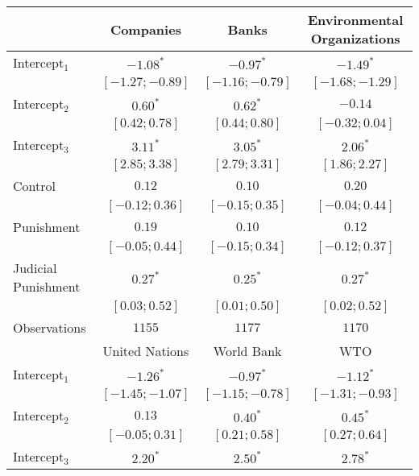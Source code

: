\begin{table}[h]
\begin{center}
\begin{threeparttable}
\begin{tabular}{l c c c}
\hline
 & Companies & Banks & Environmental
Organizations \\
\hline
Intercept$_1$       & $-1.08^{*}$       & $-0.97^{*}$       & $-1.49^{*}$       \\
                    & $ [-1.27; -0.89]$ & $ [-1.16; -0.79]$ & $ [-1.68; -1.29]$ \\
Intercept$_2$       & $0.60^{*}$        & $0.62^{*}$        & $-0.14$           \\
                    & $ [ 0.42;  0.78]$ & $ [ 0.44;  0.80]$ & $ [-0.32;  0.04]$ \\
Intercept$_3$       & $3.11^{*}$        & $3.05^{*}$        & $2.06^{*}$        \\
                    & $ [ 2.85;  3.38]$ & $ [ 2.79;  3.31]$ & $ [ 1.86;  2.27]$ \\
Control             & $0.12$            & $0.10$            & $0.20$            \\
                    & $ [-0.12;  0.36]$ & $ [-0.15;  0.35]$ & $ [-0.04;  0.44]$ \\
Punishment          & $0.19$            & $0.10$            & $0.12$            \\
                    & $ [-0.05;  0.44]$ & $ [-0.15;  0.34]$ & $ [-0.12;  0.37]$ \\
Judicial Punishment & $0.27^{*}$        & $0.25^{*}$        & $0.27^{*}$        \\
                    & $ [ 0.03;  0.52]$ & $ [ 0.01;  0.50]$ & $ [ 0.02;  0.52]$ \\
\hline
Observations        & $1155$            & $1177$            & $1170$            \\
\hline
 & United Nations & World Bank & WTO \\
\hline
Intercept$_1$       & $-1.26^{*}$       & $-0.97^{*}$       & $-1.12^{*}$       \\
                    & $ [-1.45; -1.07]$ & $ [-1.15; -0.78]$ & $ [-1.31; -0.93]$ \\
Intercept$_2$       & $0.13$            & $0.40^{*}$        & $0.45^{*}$        \\
                    & $ [-0.05;  0.31]$ & $ [ 0.21;  0.58]$ & $ [ 0.27;  0.64]$ \\
Intercept$_3$       & $2.20^{*}$        & $2.50^{*}$        & $2.78^{*}$        \\

\end{tabular}
\end{threeparttable}
\end{center}
\end{table}
